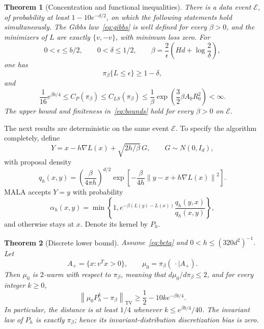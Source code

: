 \documentclass[11pt,letterpaper]{article}
\numberwithin{equation}{section}
\newtheorem{theorem}{Theorem}[section]
\theoremstyle{remark}
\newcommand{\TV}{\mathrm{TV}}
\newcommand{\1}{\mathbf 1}
\newcommand{\norm}[1]{\left\lVert#1\right\rVert}
\begin{document}
\begin{theorem}[Concentration and functional inequalities]\label{thm:main}
There is a data event $\mathcal E$, of probability at least $1-10e^{-d/2}$, on which the following statements hold simultaneously. The Gibbs law~\eqref{eq:gibbs} is well defined for every $\beta>0$, and the minimizers of $L$ are exactly $\{v,-v\}$, with minimum loss zero. For
\begin{equation}\label{eq:beta}
 0<\epsilon\le b/2,\qquad 0<\delta\le1/2,\qquad
 \beta=\frac2\epsilon\left(Hd+\log\frac2\delta\right),
\end{equation}
one has
\begin{equation}\label{eq:concentration}
 \pi_\beta\{L\le\epsilon\}\ge1-\delta,
\end{equation}
and
\begin{equation}\label{eq:bounds}
 \frac1{16}e^{\beta b/4}\le C_P(\pi_\beta)
 \le C_{LS}(\pi_\beta)
 \le\frac1\beta\exp\!\left(\frac32\beta A_0R_0^2\right)<\infty.
\end{equation}
The upper bound and finiteness in~\eqref{eq:bounds} hold for every $\beta>0$ on $\mathcal E$.
\end{theorem}

The next results are deterministic on the same event $\mathcal E$. To specify the algorithm completely, define
\begin{equation}\label{eq:proposal}
 Y=x-h\nabla L(x)+\sqrt{2h/\beta}\,G,
 \qquad G\sim N(0,I_d),
\end{equation}
with proposal density
\begin{equation}\label{eq:q}
 q_h(x,y)=\left(\frac\beta{4\pi h}\right)^{d/2}
 \exp\!\left[-\frac\beta{4h}\norm{y-x+h\nabla L(x)}^2\right].
\end{equation}
MALA accepts $Y=y$ with probability
\begin{equation}\label{eq:accept}
 \alpha_h(x,y)=\min\left\{1,
 e^{-\beta(L(y)-L(x))}\frac{q_h(y,x)}{q_h(x,y)}\right\},
\end{equation}
and otherwise stays at $x$. Denote its kernel by $P_h$.

\begin{theorem}[Discrete lower bound]\label{thm:mala}
Assume~\eqref{eq:beta} and $0<h\le(320d^2)^{-1}$. Let
\begin{equation}\label{eq:start}
 A_+=\{x:v^Tx>0\},\qquad
 \mu_0=\pi_\beta(\,\cdot\mid A_+).
\end{equation}
Then $\mu_0$ is $2$-warm with respect to $\pi_\beta$, meaning that $d\mu_0/d\pi_\beta\le2$, and for every integer $k\ge0$,
\begin{equation}\label{eq:mala-lower}
 \norm{\mu_0P_h^k-\pi_\beta}_{\TV}
 \ge\frac12-10k e^{-\beta b/4}.
\end{equation}
In particular, the distance is at least $1/4$ whenever $k\le e^{\beta b/4}/40$. The invariant law of $P_h$ is exactly $\pi_\beta$; hence its invariant-distribution discretization bias is zero.
\end{theorem}
\end{document}
